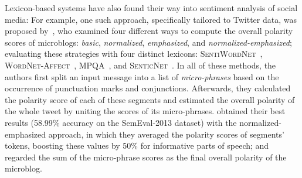 
Lexicon-based systems have also found their way into sentiment
analysis of social media: For example, one such approach, specifically
tailored to Twitter data, was proposed by~\citet{Musto:14}, who
examined four different ways to compute the overall polarity scores of
microblogs: \emph{basic}, \emph{normalized}, \emph{emphasized}, and
\emph{normalized-emphasized}; evaluating these strategies with four
distinct lexicons: \textsc{Sen\-ti\-Word\-Net}~\cite{Esuli:06c},
\textsc{Word\-Net-\-Affect}~\cite{Strapparava:04},
\textsc{MPQA}~\cite{Wiebe:05}, and
\textsc{SenticNet}~\cite{Cambria:14}.  In all of these methods, the
authors first split an input message into a list of
\emph{micro-phrases} based on the occurrence of punctuation marks and
conjunctions.  Afterwards, they calculated the polarity score of each
of these segments and estimated the overall polarity of the whole
tweet by uniting the scores of its micro-phrases.
\citeauthor{Musto:14} obtained their best results (58.99\% accuracy on
the SemEval-2013 dataset) with the normalized-emphasized approach, in
which they averaged the polarity scores of segments' tokens, boosting
these values by 50\% for informative parts of speech; and regarded the
sum of the micro-phrase scores as the final overall polarity of the
microblog.



